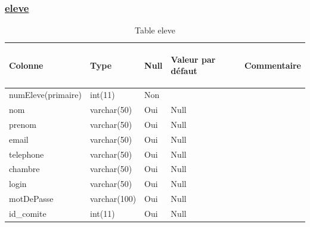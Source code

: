 \documentclass[11.5pt]{report}
\begin{document}
\subsubsection{\underline{eleve}}
\begin{table}[h]
	\begin{center}
	
	
	\begin{tabular}{|l|l|l|l|l|}
		\hline
		\begin{bf}Colonne\end{bf} & \begin{bf}Type\end{bf} & \begin{bf}Null\end{bf} & \begin{bf}Valeur par défaut\end{bf} & \begin{bf}Commentaire\end{bf}  \\
		\hline
		numEleve(primaire) & int(11) & Non & & \\
		\hline
		nom & varchar(50) & Oui &Null & \\
		\hline
		prenom & varchar(50) &Oui &Null & \\
		\hline
		email & varchar(50) & Oui &Null & \\
		\hline
		telephone & varchar(50) & Oui &Null & \\
		\hline
		chambre & varchar(50) &Oui &Null & \\
		\hline
		login & varchar(50) & Oui &Null & \\
		\hline
		motDePasse & varchar(100) & Oui &Null & \\
		\hline
		id\_comite & int(11) & Oui &Null & \\
		\hline
		
		
		
	\end{tabular}
	\caption{Table eleve}
\end{center}
\end{table}
\end{document}
